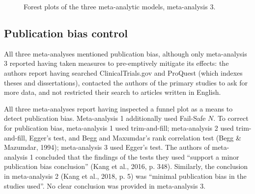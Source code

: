 \documentclass[
  man,floatsintext]{apa6}
\begin{document}
\newpage
\begin{figure}[H]

{\centering {}\newline{}

}

\caption{Forest plots of the three meta-analytic models, meta-analysis 3.}\label{fig:fig5}
\end{figure}

\hypertarget{publication-bias-control-2}{%
\subsection{Publication bias control}\label{publication-bias-control-2}}

All three meta-analyses mentioned publication bias, although only meta-analysis 3 reported having taken measures to pre-emptively mitigate its effects: the authors report having searched ClinicalTrials.gov and ProQuest (which indexes theses and dissertations), contacted the authors of the primary studies to ask for more data, and not restricted their search to articles written in English.

All three meta-analyses report having inspected a funnel plot as a means to detect publication bias. Meta-analysis 1 additionally used Fail-Safe \(N\). To correct for publication bias, meta-analysis 1 used trim-and-fill; meta-analysis 2 used trim-and-fill, Egger's test, and Begg and Maxumdar's rank correlation test (Begg \& Mazumdar, 1994); meta-analysis 3 used Egger's test. The authors of meta-analysis 1 concluded that the findings of the tests they used ``support a minor publication bias conclusion'' (Kang et al., 2016, p. 348). Similarly, the conclusion in meta-analysis 2 (Kang et al., 2018, p. 5) was ``minimal publication bias in the studies used''. No clear conclusion was provided in meta-analysis 3.
\end{document}
